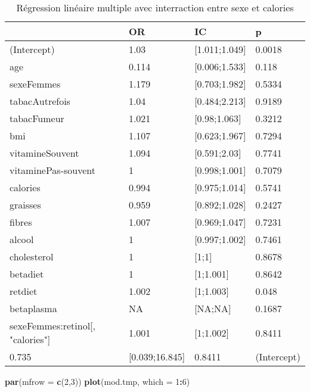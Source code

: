 \documentclass[]{article}
\newenvironment{Shaded}{\begin{snugshade}}{\end{snugshade}}
\newcommand{\KeywordTok}[1]{\textcolor[rgb]{0.13,0.29,0.53}{\textbf{#1}}}
\newcommand{\DataTypeTok}[1]{\textcolor[rgb]{0.13,0.29,0.53}{#1}}
\newcommand{\DecValTok}[1]{\textcolor[rgb]{0.00,0.00,0.81}{#1}}
\newcommand{\OperatorTok}[1]{\textcolor[rgb]{0.81,0.36,0.00}{\textbf{#1}}}
\newcommand{\NormalTok}[1]{#1}
\begin{document}
\begin{table}

\caption{\label{tab:unnamed-chunk-84}Régression linéaire multiple avec interraction entre sexe et calories}
\centering
\begin{tabular}[t]{l|l|l|l}
\hline
  & OR & IC & p\\
\hline
\rowcolor[HTML]{BBD2E1}  (Intercept) & 1.03 & [1.011;1.049] & 0.0018\\
\hline
age & 0.114 & [0.006;1.533] & 0.118\\
\hline
\rowcolor[HTML]{BBD2E1}  sexeFemmes & 1.179 & [0.703;1.982] & 0.5334\\
\hline
tabacAutrefois & 1.04 & [0.484;2.213] & 0.9189\\
\hline
\rowcolor[HTML]{BBD2E1}  tabacFumeur & 1.021 & [0.98;1.063] & 0.3212\\
\hline
bmi & 1.107 & [0.623;1.967] & 0.7294\\
\hline
\rowcolor[HTML]{BBD2E1}  vitamineSouvent & 1.094 & [0.591;2.03] & 0.7741\\
\hline
vitaminePas-souvent & 1 & [0.998;1.001] & 0.7079\\
\hline
\rowcolor[HTML]{BBD2E1}  calories & 0.994 & [0.975;1.014] & 0.5741\\
\hline
graisses & 0.959 & [0.892;1.028] & 0.2427\\
\hline
\rowcolor[HTML]{BBD2E1}  fibres & 1.007 & [0.969;1.047] & 0.7231\\
\hline
alcool & 1 & [0.997;1.002] & 0.7461\\
\hline
\rowcolor[HTML]{BBD2E1}  cholesterol & 1 & [1;1] & 0.8678\\
\hline
betadiet & 1 & [1;1.001] & 0.8642\\
\hline
\rowcolor[HTML]{BBD2E1}  retdiet & 1.002 & [1;1.003] & 0.048\\
\hline
betaplasma & NA & [NA;NA] & 0.1687\\
\hline
\rowcolor[HTML]{BBD2E1}  sexeFemmes:retinol[, "calories"] & 1.001 & [1;1.002] & 0.8411\\
\hline
0.735 & [0.039;16.845] & 0.8411 & (Intercept)\\
\hline
\end{tabular}
\end{table}

\begin{Shaded}
\begin{Highlighting}[]
\KeywordTok{par}\NormalTok{(}\DataTypeTok{mfrow =} \KeywordTok{c}\NormalTok{(}\DecValTok{2}\NormalTok{,}\DecValTok{3}\NormalTok{))}
\KeywordTok{plot}\NormalTok{(mod.tmp, }\DataTypeTok{which =} \DecValTok{1}\OperatorTok{:}\DecValTok{6}\NormalTok{)}
\end{Highlighting}
\end{Shaded}
\end{document}
